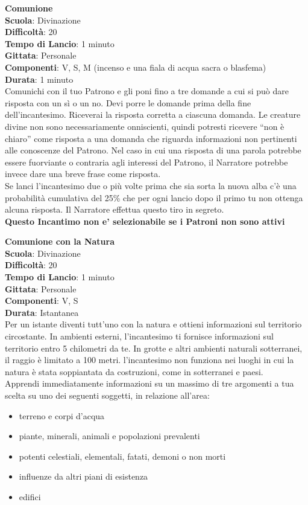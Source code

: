 \begin{multicols}{2}
\medskip\textbf{Comunione}\\
\textbf{Scuola}: Divinazione\\
\textbf{Difficoltà}:  20\\
\textbf{Tempo di Lancio}: 1 minuto\\
\textbf{Gittata}: Personale\\
\textbf{Componenti}: V, S, M (incenso e una fiala di acqua sacra o blasfema)\\
\textbf{Durata}: 1 minuto\\
Comunichi con il tuo Patrono e gli poni fino a tre domande a cui si può dare risposta con un sì o un no. Devi porre le domande prima della fine dell'incantesimo. Riceverai la risposta corretta a ciascuna domanda. Le creature divine non sono necessariamente onniscienti, quindi potresti ricevere “non è chiaro” come risposta a una domanda che riguarda informazioni non pertinenti alle conoscenze del Patrono. Nel caso in cui una risposta di una parola potrebbe essere fuorviante o contraria agli interessi del Patrono, il Narratore potrebbe invece dare una breve frase come risposta.\\
Se lanci l'incantesimo due o più volte prima che sia sorta la nuova alba c’è una probabilità cumulativa del 25\% che per ogni lancio dopo il primo tu non ottenga alcuna risposta. Il Narratore effettua questo tiro in segreto.\\
\textbf{Questo Incantimo non e' selezionabile se i Patroni non sono attivi}

\medskip\textbf{Comunione con la Natura}\\
\textbf{Scuola}: Divinazione\\
\textbf{Difficoltà}:  20\\
\textbf{Tempo di Lancio}: 1 minuto\\
\textbf{Gittata}: Personale\\
\textbf{Componenti}: V, S\\
\textbf{Durata}: Istantanea\\
Per un istante diventi tutt’uno con la natura e ottieni informazioni sul territorio circostante. In ambienti esterni, l'incantesimo ti fornisce informazioni sul territorio entro 5 chilometri da te. In grotte e altri  ambienti naturali sotterranei, il raggio è limitato a 100 metri. l'incantesimo non funziona nei luoghi in cui la natura è stata soppiantata da costruzioni, come in sotterranei e paesi.\\
Apprendi immediatamente informazioni su un massimo di tre argomenti a tua scelta su uno dei seguenti soggetti, in relazione all'area:
\begin{itemize}
	\item 
	terreno e corpi d’acqua
	\item 
	piante, minerali, animali e popolazioni prevalenti
	\item 
    potenti celestiali, elementali, fatati, demoni o non morti
	\item 
    influenze da altri piani di esistenza
	\item
    edifici
\end{itemize}


\end{multicols}
